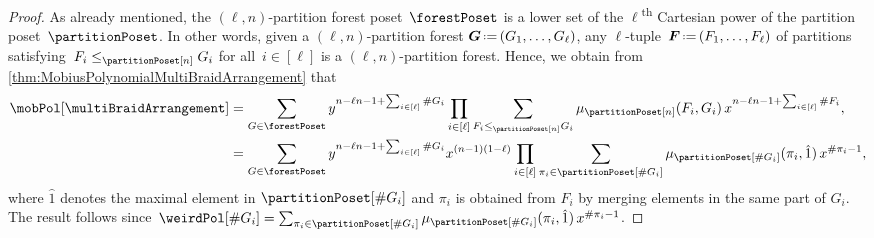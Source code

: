 \documentclass{amsart}
\theoremstyle{definition}
\renewcommand{\b}[1]{{\boldsymbol{#1}}} %
\newcommand{\eqdef}{\mbox{\,\raisebox{0.2ex}{\scriptsize\ensuremath{\mathrm:}}\ensuremath{=}\,}} %
\newcommand{\ordinal}{\textsuperscript{th}} %
\renewcommand{\b}[1]{\boldsymbol{#1}} %
\begin{document}
\begin{proof}
As already mentioned, the $(\ell,n)$-partition forest poset~$\forestPoset$ is a lower set of the $\ell$\ordinal{} Cartesian power of the partition poset~$\partitionPoset$.
In other words, given a $(\ell,n)$-partition forest $\b{G} \eqdef (G_1, \dots, G_\ell)$, any $\ell$-tuple~$\b{F} \eqdef (F_1, \dots, F_\ell)$ of partitions satisfying~$F_i \le_{\partitionPoset[n]} G_i$ for all~$i \in [\ell]$ is a $(\ell,n)$-partition forest.
Hence, we obtain from \cref{thm:MobiusPolynomialMultiBraidArrangement} that
\begin{align*}
\mobPol[\multiBraidArrangement]
& = \sum_{G \in \forestPoset} y^{n-\ell n - 1 + \sum_{i \in [\ell]} \#G_i} \prod_{i \in [\ell]} \sum_{F_i \leq_{\partitionPoset[n]} G_i } \mu_{\partitionPoset[n]}(F_i,G_i) \, x^{n-\ell n - 1 + \sum_{i \in [\ell]} \#F_i}, \\
& = \sum_{G \in \forestPoset} y^{n-\ell n - 1 + \sum_{i \in [\ell]} \#G_i} x^{(n-1)(1-\ell)} \prod_{i \in [\ell]} \sum_{\pi_i \in \partitionPoset[\#G_i]}  \mu_{\partitionPoset[\#G_i]}(\pi_i,\hat{1}) \, x^{\#\pi_i-1}, 
\end{align*}
where $\hat{1}$ denotes the maximal element in $\partitionPoset[\#G_i]$ and $\pi_i$ is obtained from $F_i$ by merging elements in the same part of $G_i$.
The result follows since~$\weirdPol[\#G_i] = \sum_{\pi_i \in \partitionPoset[\#G_i]}  \mu_{\partitionPoset[\#G_i]}(\pi_i,\hat{1}) \, x^{\#\pi_i-1}$.
\end{proof}
\end{document}
